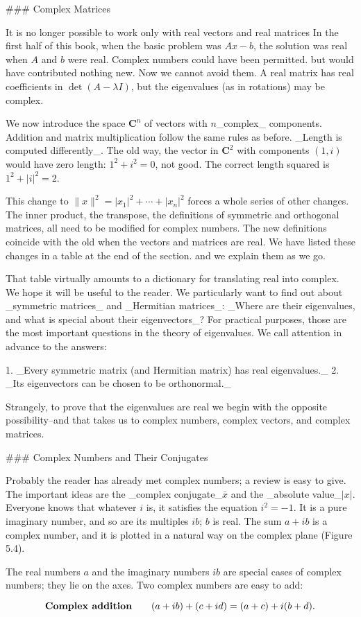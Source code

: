 

### Complex Matrices

It is no longer possible to work only with real vectors and real matrices In the first half of this book, when the basic problem was \(Ax-b\), the solution was real when \(A\) and \(b\) were real. Complex numbers could have been permitted. but would have contributed nothing new. Now we cannot avoid them. A real matrix has real coefficients in \(\det(A-\lambda I)\), but the eigenvalues (as in rotations) may be complex.

We now introduce the space \(\mathbf{C}^{n}\) of vectors with \(n\)_complex_ components. Addition and matrix multiplication follow the same rules as before. _Length is computed differently_. The old way, the vector in \(\mathbf{C}^{2}\) with components \((1,i)\) would have zero length: \(1^{2}+i^{2}=0\), not good. The correct length squared is \(1^{2}+|i|^{2}=2\).

This change to \(\|x\|^{2}=|x_{1}|^{2}+\cdots+|x_{n}|^{2}\) forces a whole series of other changes. The inner product, the transpose, the definitions of symmetric and orthogonal matrices, all need to be modified for complex numbers. The new definitions coincide with the old when the vectors and matrices are real. We have listed these changes in a table at the end of the section. and we explain them as we go.

That table virtually amounts to a dictionary for translating real into complex. We hope it will be useful to the reader. We particularly want to find out about _symmetric matrices_ and _Hermitian matrices_: _Where are their eigenvalues, and what is special about their eigenvectors_? For practical purposes, those are the most important questions in the theory of eigenvalues. We call attention in advance to the answers:

1. _Every symmetric matrix (and Hermitian matrix) has real eigenvalues._
2. _Its eigenvectors can be chosen to be orthonormal._

Strangely, to prove that the eigenvalues are real we begin with the opposite possibility--and that takes us to complex numbers, complex vectors, and complex matrices.

### Complex Numbers and Their Conjugates

Probably the reader has already met complex numbers; a review is easy to give. The important ideas are the _complex conjugate_\(\bar{x}\) and the _absolute value_\(|x|\). Everyone knows that whatever \(i\) is, it satisfies the equation \(i^{2}=-1\). It is a pure imaginary number, and so are its multiples \(ib\); \(b\) is real. The sum \(a+ib\) is a complex number, and it is plotted in a natural way on the complex plane (Figure 5.4).

The real numbers \(a\) and the imaginary numbers \(ib\) are special cases of complex numbers; they lie on the axes. Two complex numbers are easy to add:

\[\mbox{\bf Complex addition}\qquad(a+ib)+(c+id)=(a+c)+i(b+d).\]